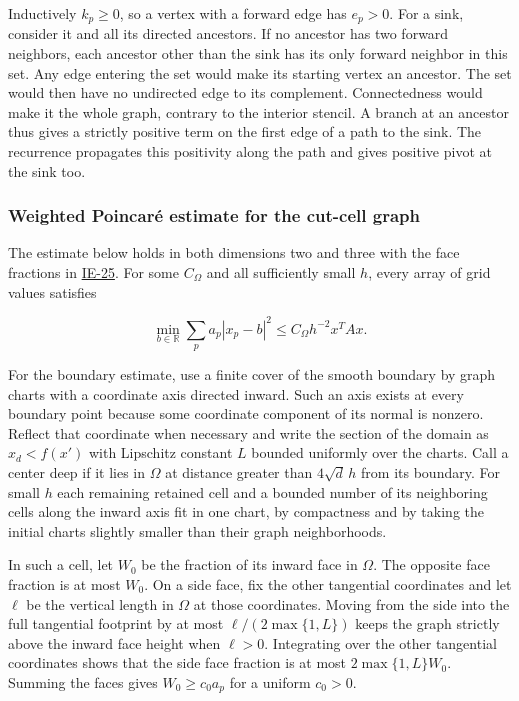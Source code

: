\documentclass[11pt,a4paper]{article}
\begin{document}
Inductively \(k_p\ge0\), so a vertex with a forward edge has \(e_p>0\).
For a sink, consider it and all its directed ancestors. If no ancestor
has two forward neighbors, each ancestor other than the sink has its
only forward neighbor in this set. Any edge entering the set would make
its starting vertex an ancestor. The set would then have no undirected
edge to its complement. Connectedness would make it the whole graph,
contrary to the interior stencil. A branch at an ancestor thus gives a
strictly positive term on the first edge of a path to the sink. The
recurrence propagates this positivity along the path and gives positive
pivot at the sink too.

\subsubsection{Weighted Poincaré estimate for the cut-cell
graph}\label{weighted-poincaruxe9-estimate-for-the-cut-cell-graph}

The estimate below holds in both dimensions two and three with the face
fractions in
\href{https://github.com/ajt60gaibb/OpenProblemsInNLA/blob/main/linear-systems-and-elimination/IE-25/README.md}{IE-25}.
For some \(C_\Omega\) and all sufficiently small \(h\), every array of
grid values satisfies

\[\min_{b\in\mathbb R}\sum_p a_p|x_p-b|^2\le C_\Omega h^{-2}x^TAx.\]

For the boundary estimate, use a finite cover of the smooth boundary by
graph charts with a coordinate axis directed inward. Such an axis exists
at every boundary point because some coordinate component of its normal
is nonzero. Reflect that coordinate when necessary and write the section
of the domain as \(x_d< f(x')\) with Lipschitz constant \(L\) bounded
uniformly over the charts. Call a center deep if it lies in \(\Omega\)
at distance greater than \(4\sqrt d\,h\) from its boundary. For small
\(h\) each remaining retained cell and a bounded number of its
neighboring cells along the inward axis fit in one chart, by compactness
and by taking the initial charts slightly smaller than their graph
neighborhoods.

In such a cell, let \(W_0\) be the fraction of its inward face in
\(\Omega\). The opposite face fraction is at most \(W_0\). On a side
face, fix the other tangential coordinates and let \(\ell\) be the
vertical length in \(\Omega\) at those coordinates. Moving from the side
into the full tangential footprint by at most \(\ell/(2\max\{1,L\})\)
keeps the graph strictly above the inward face height when \(\ell>0\).
Integrating over the other tangential coordinates shows that the side
face fraction is at most \(2\max\{1,L\}W_0\). Summing the faces gives
\(W_0\ge c_0a_p\) for a uniform \(c_0>0\).
\end{document}
